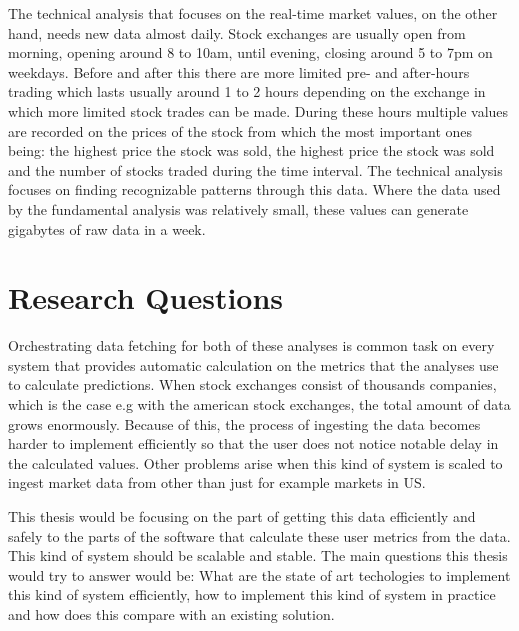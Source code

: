 \documentclass[article,11pt]{article}
\begin{document}
The technical analysis that focuses on the real-time market values, on the other hand, needs new data almost daily. Stock exchanges are usually open from morning, opening around 8 to 10am, until evening, closing around 5 to 7pm on weekdays. Before and after this there are more limited pre- and after-hours trading which lasts usually around 1 to 2 hours depending on the exchange in which more limited stock trades can be made. During these hours multiple values are recorded on the prices of the stock from which the most important ones being: the highest price the stock was sold, the highest price the stock was sold and the number of stocks traded during the time interval. The technical analysis focuses on finding recognizable patterns through this data. \cite{murphy} Where the data used by the fundamental analysis was relatively small, these values can generate gigabytes of raw data in a week.



\section{Research Questions}

Orchestrating data fetching for both of these analyses is common task on every system that provides automatic calculation on the metrics that the analyses use to calculate predictions. When stock exchanges consist of thousands companies, which is the case e.g with the american stock exchanges, the total amount of data grows enormously. Because of this, the process of ingesting the data becomes harder to implement efficiently so that the user does not notice notable delay in the calculated values. Other problems arise when this kind of system is scaled to ingest market data from other than just for example markets in US.  

This thesis would be focusing on the part of getting this data efficiently and safely to the parts of the software that calculate these user metrics from the data. This kind of system should be scalable and stable. The main questions this thesis would try to answer would be: What are the state of art techologies to implement this kind of system efficiently, how to implement this kind of system in practice and how does this compare with an existing solution.
\end{document}
